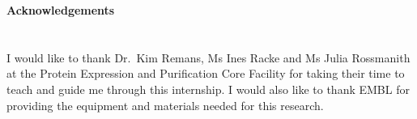 \documentclass[11pt]{article}
\begin{document}
\newpage 
\vspace*{\fill}
{\huge\bfseries Acknowledgements} \\
\\
\\
\large{I would like to thank Dr.~Kim Remans, Ms Ines Racke and Ms Julia Rossmanith at the Protein Expression and Purification Core Facility for taking their time to teach and guide me through this internship. I would also like to thank EMBL for providing the equipment and materials needed for this research.}
\vfill

\newpage


\end{document}
